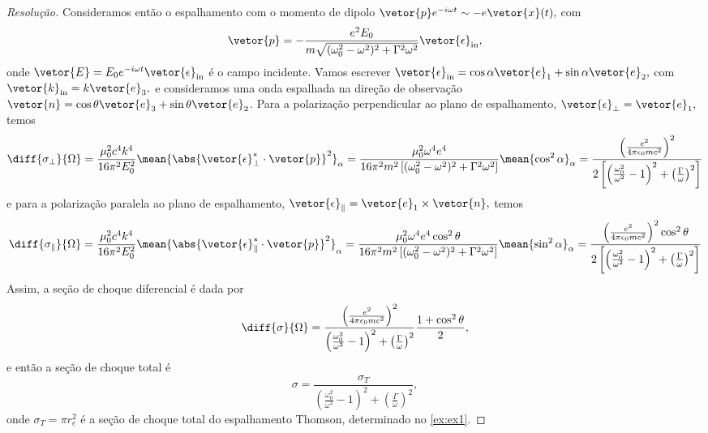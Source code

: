 \begin{proof}[Resolução]
   Consideramos então o espalhamento com o momento de dipolo \(\vetor{p}e^{-i \omega t} \sim -e \vetor{x}(t),\) com
   \begin{equation*}
      \vetor{p} = -\frac{e^2 E_0}{m \sqrt{(\omega_0^2 - \omega^2)^2 + \Gamma^2 \omega^2}}\vetor{\epsilon}_{\mathrm{in}},
   \end{equation*}
   onde \(\vetor{E} = E_0 e^{-i \omega t} \vetor{\epsilon}_\mathrm{in}\) é o campo incidente. Vamos escrever \(\vetor{\epsilon}_{\mathrm{in}} = \cos \alpha \vetor{e}_1 + \sin \alpha \vetor{e}_2,\) com \(\vetor{k}_{\mathrm{in}} = k \vetor{e}_3,\) e consideramos uma onda espalhada na direção de observação \(\vetor{n} = \cos\theta \vetor{e}_3 + \sin\theta \vetor{e}_2\). Para a polarização perpendicular ao plano de espalhamento, \(\vetor{\epsilon}_{\perp} = \vetor{e}_1,\) temos
   \begin{equation*}
      \diff{\sigma_{\perp}}{\Omega} = \frac{\mu_0^2 c^4 k^4}{16 \pi^2 E_0^2}\mean{\abs{\vetor{\epsilon}_{\perp}^* \cdot \vetor{p}}^2}_{\alpha} = \frac{\mu_0^2 \omega^4 e^4}{16 \pi^2 m^2 \left[(\omega_0^2 - \omega^2)^2 + \Gamma^2 \omega^2\right]} \mean{\cos^2 \alpha}_\alpha = \frac{\left(\frac{e^2}{4\pi \epsilon_0 m c^2}\right)^2}{2\left[\left(\frac{\omega_0^2}{\omega^2} - 1\right)^2 + \left(\frac{\Gamma}{\omega}\right)^2\right]}
   \end{equation*}
   e para a polarização paralela ao plano de espalhamento, \(\vetor{\epsilon}_\parallel = \vetor{e}_1 \times \vetor{n},\) temos
   \begin{equation*}
      \diff{\sigma_{\parallel}}{\Omega} = \frac{\mu_0^2 c^4 k^4}{16 \pi^2 E_0^2}\mean{\abs{\vetor{\epsilon}_{\parallel}^* \cdot \vetor{p}}^2}_{\alpha} = \frac{\mu_0^2 \omega^4 e^4\cos^2\theta}{16 \pi^2 m^2 \left[(\omega_0^2 - \omega^2)^2 + \Gamma^2 \omega^2\right]} \mean{\sin^2 \alpha}_\alpha = \frac{\left(\frac{e^2}{4\pi \epsilon_0 m c^2}\right)^2\cos^2\theta}{2\left[\left(\frac{\omega_0^2}{\omega^2} - 1\right)^2 + \left(\frac{\Gamma}{\omega}\right)^2\right]}
   \end{equation*}
   Assim, a seção de choque diferencial é dada por
   \begin{equation*}
      \diff{\sigma}{\Omega} = \frac{\left(\frac{e^2}{4\pi \epsilon_0 m c^2}\right)^2}{\left(\frac{\omega_0^2}{\omega^2} - 1\right)^2 + \left(\frac{\Gamma}{\omega}\right)^2} \frac{1 + \cos^2\theta}{2},
   \end{equation*}
   e então a seção de choque total é
   \begin{equation*}
      \sigma = \frac{\sigma_T}{\left(\frac{\omega_0^2}{\omega^2} - 1\right)^2 + \left(\frac{\Gamma}{\omega}\right)^2},
   \end{equation*}
   onde \(\sigma_T = \pi r_e^2\) é a seção de choque total do espalhamento Thomson, determinado no \cref{ex:ex1}. 


\end{proof}
